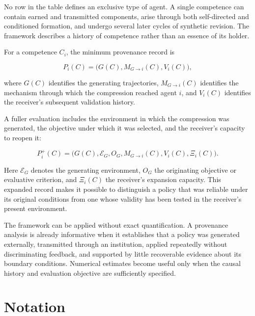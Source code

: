 \documentclass[11pt]{article}
\begin{document}
No row in the table defines an exclusive type of agent. A single competence can contain earned and transmitted components, arise through both self-directed and conditioned formation, and undergo several later cycles of synthetic revision. The framework describes a history of competence rather than an essence of its holder.

For a competence $C_i$, the minimum provenance record is

\[
P_i(C)
=
\bigl(
G(C),M_{G\to i}(C),V_i(C)
\bigr),
\]

where $G(C)$ identifies the generating trajectories, $M_{G\to i}(C)$ identifies the mechanism through which the compression reached agent $i$, and $V_i(C)$ identifies the receiver's subsequent validation history.

A fuller evaluation includes the environment in which the compression was generated, the objective under which it was selected, and the receiver's capacity to reopen it:

\[
P_i^{+}(C)
=
\bigl(
G(C),
\mathcal{E}_{G},
O_{G},
M_{G\to i}(C),
V_i(C),
\Xi_i(C)
\bigr).
\]

Here $\mathcal{E}_{G}$ denotes the generating environment, $O_G$ the originating objective or evaluative criterion, and $\Xi_i(C)$ the receiver's expansion capacity. This expanded record makes it possible to distinguish a policy that was reliable under its original conditions from one whose validity has been tested in the receiver's present environment.

The framework can be applied without exact quantification. A provenance analysis is already informative when it establishes that a policy was generated externally, transmitted through an institution, applied repeatedly without discriminating feedback, and supported by little recoverable evidence about its boundary conditions. Numerical estimates become useful only when the causal history and evaluation objective are sufficiently specified.

\section{Notation}
\end{document}

